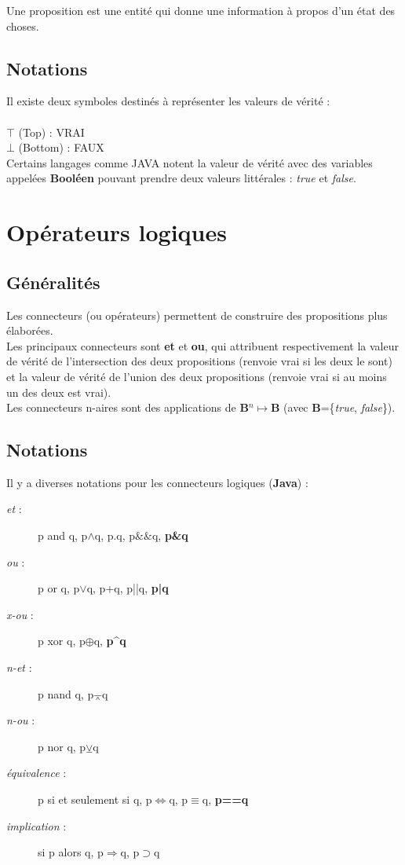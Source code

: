 \documentclass[a4paper,10pt]{book}
\begin{document}
Une proposition est une entité qui donne une information à propos d’un état des choses.

\subsection{Notations}
Il existe deux symboles destinés à représenter les valeurs de vérité :\\\\
$\top$ (Top) : VRAI\\
$\bot$ (Bottom) : FAUX\\

Certains langages comme JAVA notent la valeur de vérité avec des variables appelées \textbf{Booléen} pouvant prendre deux valeurs littérales : \textit{true} et \textit{false}.

\section{Opérateurs logiques}
\subsection{Généralités}
Les connecteurs (ou opérateurs) permettent de construire des propositions plus élaborées.\\

Les principaux connecteurs sont \textbf{et} et \textbf{ou}, qui attribuent respectivement la valeur de vérité de l'intersection des deux propositions (renvoie vrai si les deux le sont) et la valeur de vérité de l'union des deux propositions (renvoie vrai si au moins un des deux est vrai).\\

Les connecteurs n-aires sont des applications de \textbf{B}$^{n}\mapsto$\textbf{B} (avec \textbf{B}=\{\textit{true}, \textit{false}\}).

\subsection{Notations}
Il y a diverses notations pour les connecteurs logiques (\textbf{Java}) :
\begin{description}
\item[\textit{et} :] p and q, p$\wedge$q, p.q, p$\&\&$q, \textbf{p\&q}
\item[\textit{ou} :] p or q, p$\vee$q, p+q, p||q, \textbf{p|q}
\item[\textit{x-ou} :] p xor q, p$\oplus$q, \textbf{p\^{}q}
\item[\textit{n-et} :] p nand q, p$\barwedge$q
\item[\textit{n-ou} :] p nor q, p$\veebar$q
\item[\textit{équivalence} :] p si et seulement si q, p$\Leftrightarrow$q, p$\equiv$q, \textbf{p==q}
\item[\textit{implication} :] si p alors q, p$\Rightarrow$q, p$\supset$q
\end{description}
\end{document}
